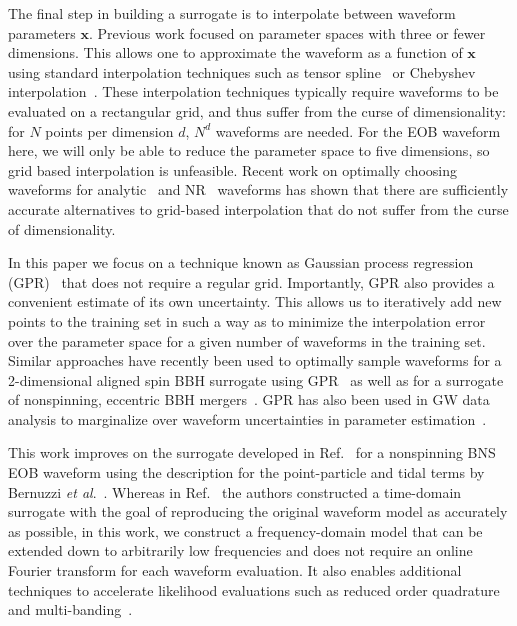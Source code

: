 \documentclass[prd,aps,letter,twocolumn,floatfix,notitlepage,nofootinbib]{revtex4-1}
\def\bx{\mathbf{x}}
\begin{document}
The final step in building a surrogate is to interpolate between waveform parameters $\bx$. Previous work focused on parameter spaces with three or fewer dimensions. This allows one to approximate the waveform as a function of $\bx$ using standard interpolation techniques such as tensor spline~\cite{Puerrer2014, Puerrer2015} or Chebyshev interpolation~\cite{LackeyBernuzziGalley2017}. These interpolation techniques typically require waveforms to be evaluated on a rectangular grid, and thus suffer from the curse of dimensionality: for $N$ points per dimension $d$,  $N^d$ waveforms are needed. For the EOB waveform here, we will only be able to reduce the parameter space to five dimensions, so grid based interpolation is unfeasible. Recent work on optimally choosing waveforms for analytic~\cite{DoctorFarrHolz2017} and NR~\cite{BlackmanFieldScheel2017a, BlackmanFieldScheel2017b} waveforms has shown that there are sufficiently accurate alternatives to grid-based interpolation that do not suffer from the curse of dimensionality.

In this paper we focus on a technique known as Gaussian process regression (GPR)~\cite{RasmussenWilliams2006} that does not require a regular grid. Importantly, GPR also provides a convenient estimate of its own uncertainty. This allows us to iteratively add new points to the training set in such a way as to minimize the interpolation error over the parameter space for a given number of waveforms in the training set. Similar approaches have recently been used to optimally sample waveforms for a 2-dimensional aligned spin BBH surrogate using GPR~\cite{DoctorFarrHolz2017} as well as for a surrogate of nonspinning, eccentric BBH mergers~\cite{HuertaMooreKumar2017}. GPR has also been used in GW data analysis to marginalize over waveform uncertainties in parameter estimation~\cite{MooreGair2014, MooreBerryChua2016}.

This work improves on the surrogate developed in Ref.~\cite{LackeyBernuzziGalley2017} for a nonspinning BNS EOB waveform using the description for the point-particle and tidal terms by Bernuzzi {\it et al}.~\cite{Bernuzzi:2014owa}. Whereas in Ref.~\cite{LackeyBernuzziGalley2017} the authors constructed a time-domain surrogate with the goal of reproducing the original waveform model as accurately as possible, in this work, we construct a frequency-domain model that can be extended down to arbitrarily low frequencies and does not require an online Fourier transform for each waveform evaluation. It also enables additional techniques to accelerate likelihood evaluations such as reduced order quadrature~\cite{Antil2013, CanizaresFieldGair2013, CanizaresFieldGair2015, Smith:2016qas} and multi-banding~\cite{VinciguerraVeitchMandel2017}. 
\end{document}
